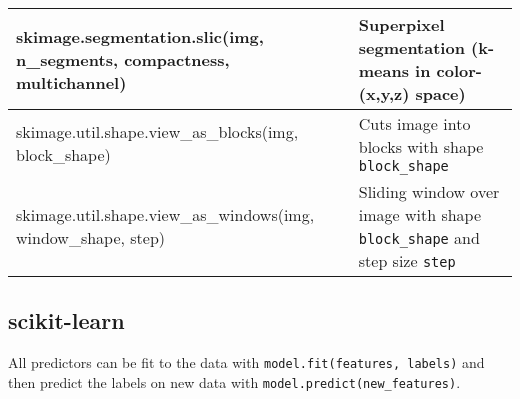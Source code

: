 \begin{tabularx}{\textwidth}{t{8cm} X}
    skimage.segmentation.slic(img, n\_segments, compactness, multichannel)         & Superpixel segmentation (k-means in color-(x,y,z) space)                                                                                                                      \\\hline

    skimage.util.shape.view\_as\_blocks(img, block\_shape)                         & Cuts image into blocks with shape \texttt{block\_shape}                                                                                                                       \\\hline
    skimage.util.shape.view\_as\_windows(img, window\_shape, step)                 & Sliding window over image with shape \texttt{block\_shape} and step size \texttt{step}                                                                                        \\\hline
\end{tabularx}

\subsection{scikit-learn}
All predictors can be fit to the data with \texttt{model.fit(features, labels)} and then predict the labels on new data with \texttt{model.predict(new\_features)}.


